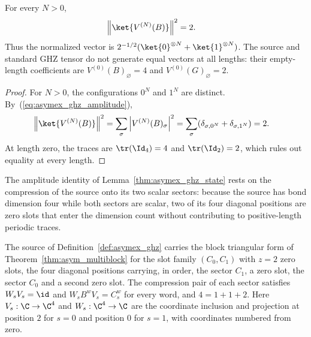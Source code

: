 \begin{lemma}
    \label{thm:asymex_ghz_norm}
    \leanok
    For every $N>0$,
    \begin{align}
        \left\|\ket{V^{(N)}(B)}\right\|^2 & =2.
        \notag
    \end{align}
    Thus the normalized vector is
    $2^{-1/2}(\ket{0}^{\otimes N}+\ket{1}^{\otimes N})$.
    The source and standard GHZ tensor do not generate equal vectors at
    all lengths: their empty-length coefficients are
    $V^{(0)}(B)_\varnothing=4$ and $V^{(0)}(G)_\varnothing=2$.
\end{lemma}

\begin{proof}
    \leanok
    For $N>0$, the configurations $0^N$ and $1^N$ are distinct.
    By~(\ref{eq:asymex_ghz_amplitude}),
    \begin{align}
        \left\|\ket{V^{(N)}(B)}\right\|^2
         & =\sum_\sigma\left|V^{(N)}(B)_\sigma\right|^2
        =\sum_\sigma(\delta_{\sigma,0^N}+\delta_{\sigma,1^N})
        =2.
        \notag
    \end{align}
    At length zero, the traces are $\tr(\Id_4)=4$ and
    $\tr(\Id_2)=2$, which rules out equality at every length.
\end{proof}

The amplitude identity of Lemma~\ref{thm:asymex_ghz_state} rests on
the compression of the source onto its two scalar sectors: because the
source has bond dimension four while both sectors are scalar, two of its
four diagonal positions are zero slots that enter the dimension count
without contributing to positive-length periodic traces.

\begin{lemma}
    \label{thm:asymex_ghz_compression}
    \leanok
    The source of Definition~\ref{def:asymex_ghz} carries the block
    triangular form of Theorem~\ref{thm:asym_multiblock} for the slot family
    $(C_0,C_1)$ with $z=2$ zero slots, the four diagonal positions carrying,
    in order, the sector $C_1$, a zero slot, the sector $C_0$ and a second
    zero slot. The compression pair of each sector satisfies $W_sV_s=\id$
    and $W_sB^wV_s=C_s^w$ for every word, and $4=1+1+2$.
    Here $V_s:\C\to\C^4$ and $W_s:\C^4\to\C$ are the coordinate
    inclusion and projection at position $2$ for $s=0$ and position $0$
    for $s=1$, with coordinates numbered from zero.
\end{lemma}

